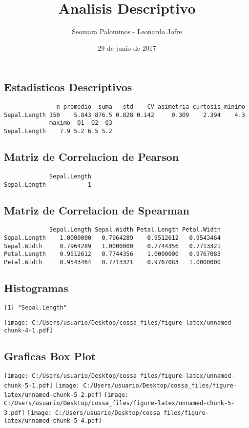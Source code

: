 \documentclass[]{article}
\title{Analisis Descriptivo}
\author{Seomara Palominos - Leonardo Jofre}
\date{29 de junio de 2017}
\begin{document}
\maketitle

\subsection{Estadisticos Descriptivos}\label{estadisticos-descriptivos}

\begin{verbatim}
               n promedio  suma   std    CV asimetria curtosis minimo
Sepal.Length 150    5.843 876.5 0.828 0.142     0.309    2.394    4.3
             maximo  Q1  Q2  Q3
Sepal.Length    7.9 5.2 6.5 5.2
\end{verbatim}

\subsection{Matriz de Correlacion de
Pearson}\label{matriz-de-correlacion-de-pearson}

\begin{verbatim}
             Sepal.Length
Sepal.Length            1
\end{verbatim}

\subsection{Matriz de Correlacion de
Spearman}\label{matriz-de-correlacion-de-spearman}

\begin{verbatim}
             Sepal.Length Sepal.Width Petal.Length Petal.Width
Sepal.Length    1.0000000   0.7964289    0.9512612   0.9543464
Sepal.Width     0.7964289   1.0000000    0.7744356   0.7713321
Petal.Length    0.9512612   0.7744356    1.0000000   0.9767083
Petal.Width     0.9543464   0.7713321    0.9767083   1.0000000
\end{verbatim}

\pagebreak

\subsection{Histogramas}\label{histogramas}

\begin{verbatim}
[1] "Sepal.Length"
\end{verbatim}

\texttt{[image: C:/Users/usuario/Desktop/cossa\_files/figure-latex/unnamed-chunk-4-1.pdf]}

\subsection{Graficas Box Plot}\label{graficas-box-plot}

\texttt{[image: C:/Users/usuario/Desktop/cossa\_files/figure-latex/unnamed-chunk-5-1.pdf]}
\texttt{[image: C:/Users/usuario/Desktop/cossa\_files/figure-latex/unnamed-chunk-5-2.pdf]}
\texttt{[image: C:/Users/usuario/Desktop/cossa\_files/figure-latex/unnamed-chunk-5-3.pdf]}
\texttt{[image: C:/Users/usuario/Desktop/cossa\_files/figure-latex/unnamed-chunk-5-4.pdf]}
\end{document}

